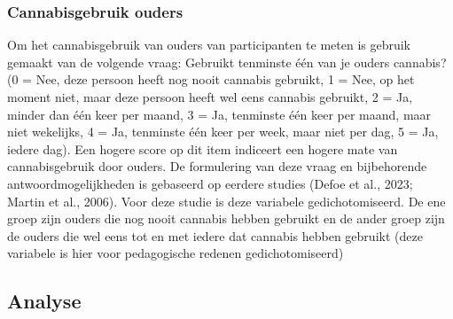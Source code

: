 \documentclass[
  letterpaper,
  DIV=11,
  numbers=noendperiod]{scrartcl}
\begin{document}
\hypertarget{cannabisgebruik-ouders}{%
\subsubsection{Cannabisgebruik ouders}\label{cannabisgebruik-ouders}}

Om het cannabisgebruik van ouders van participanten te meten is gebruik
gemaakt van de volgende vraag: Gebruikt tenminste één van je ouders
cannabis? (0 = Nee, deze persoon heeft nog nooit cannabis gebruikt, 1 =
Nee, op het moment niet, maar deze persoon heeft wel eens cannabis
gebruikt, 2 = Ja, minder dan één keer per maand, 3 = Ja, tenminste één
keer per maand, maar niet wekelijks, 4 = Ja, tenminste één keer per
week, maar niet per dag, 5 = Ja, iedere dag). Een hogere score op dit
item indiceert een hogere mate van cannabisgebruik door ouders. De
formulering van deze vraag en bijbehorende antwoordmogelijkheden is
gebaseerd op eerdere studies (Defoe et al., 2023; Martin et al., 2006).
Voor deze studie is deze variabele gedichotomiseerd. De ene groep zijn
ouders die nog nooit cannabis hebben gebruikt en de ander groep zijn de
ouders die wel eens tot en met iedere dat cannabis hebben gebruikt (deze
variabele is hier voor pedagogische redenen gedichotomiseerd)

\hypertarget{analyse}{%
\subsection{Analyse}\label{analyse}}
\end{document}
